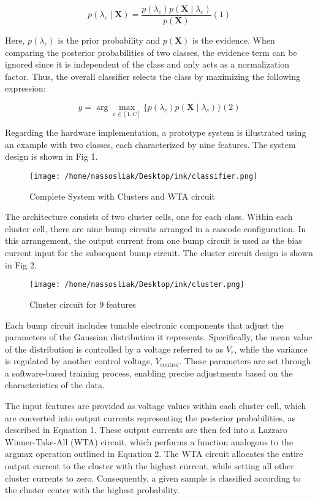 \documentclass[conference]{IEEEtran}
\begin{document}
\[
p(\lambda_c \mid \mathbf{X}) = \frac{p(\lambda_c) p(\mathbf{X} \mid \lambda_c)}{p(\mathbf{X})} (1)
\]

Here, \( p(\lambda_c) \) is the prior probability and \( p(\mathbf{X}) \) is the evidence. When comparing the posterior probabilities of two classes, the evidence term can be ignored since it is independent of the class and only acts as a normalization factor. Thus, the overall classifier selects the class by maximizing the following expression:

\[
y = \arg\max_{c \in [1, C]} \{p(\lambda_c) p(\mathbf{X} \mid \lambda_c)\} (2)
\]


Regarding the hardware implementation, a prototype system is illustrated using an example with two classes, each characterized by nine features. The system design is shown in Fig 1.
\begin{figure}[!h]
    \centering

    \texttt{[image: /home/nassosliak/Desktop/ink/classifier.png]}
    \caption{Complete System with Clusters and WTA circuit}
    \label{fig:classifier}
\end{figure}

The architecture consists of two cluster cells, one for each class. Within each cluster cell, there are nine bump circuits arranged in a cascode configuration. In this arrangement, the output current from one bump circuit is used as the bias current input for the subsequent bump circuit. The cluster circuit design is shown in Fig 2.
\begin{figure}[!h]
    \centering
    \texttt{[image: /home/nassosliak/Desktop/ink/cluster.png]}
    \caption{Cluster circuit for 9 features}
    \label{fig:cluster}
\end{figure}
Each bump circuit includes tunable electronic components that adjust the parameters of the Gaussian distribution it represents. Specifically, the mean value of the distribution is controlled by a voltage referred to as \(V_r\), while the variance is regulated by another control voltage, \(V_{\text{control}}\). These parameters are set through a software-based training process, enabling precise adjustments based on the characteristics of the data.


The input features are provided as voltage values within each cluster cell, which are converted into output currents representing the posterior probabilities, as described in Equation 1. These output currents are then fed into a Lazzaro Winner-Take-All (WTA) circuit, which performs a function analogous to the argmax operation outlined in Equation 2. The WTA circuit allocates the entire output current to the cluster with the highest current, while setting all other cluster currents to zero. Consequently, a given sample is classified according to the cluster center with the highest probability.
\end{document}
